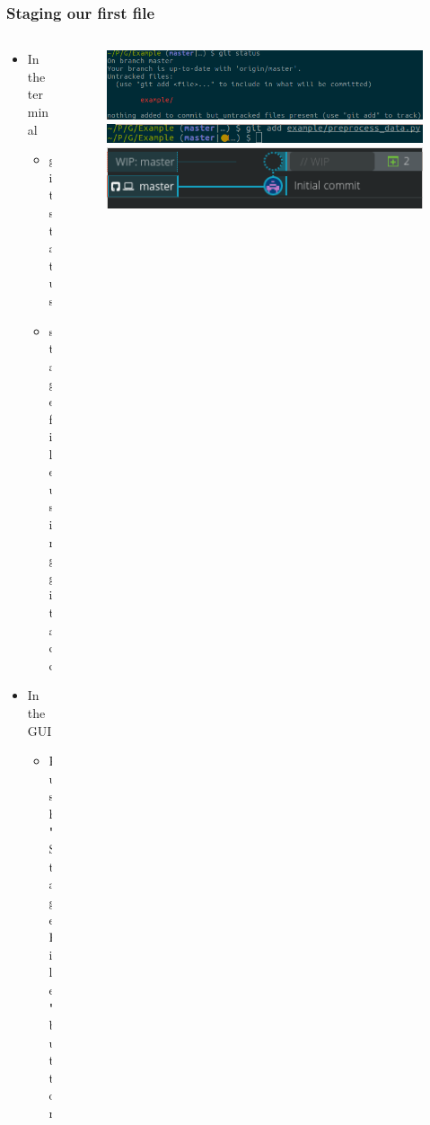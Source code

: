 \begin{frame}
	\frametitle{Staging our first file}
	\begin{columns}
		\begin{column}{0.35\textwidth}
			\begin{itemize}[<+->]
				\item In the terminal
					\begin{itemize}[<+->]
						\item git status
						\item stage file using git add
					\end{itemize}
				\item In the GUI
					\begin{itemize}[<+->]
						\item Push "Stage File" button
					\end{itemize}
			\end{itemize}
		\end{column}
		\begin{column}{0.65\textwidth}
			\begin{figure}
				\centering
				\begin{overprint}
					\includegraphics[width=\textwidth]{pictures/term_status.png}
					\onslide<3>\includegraphics[width=\textwidth]{pictures/term_add.png}
					\onslide<4>\includegraphics[width=\textwidth]{pictures/kraken_status.png}

\end{overprint}
\end{figure}
\end{column}
\end{columns}
\end{frame}
